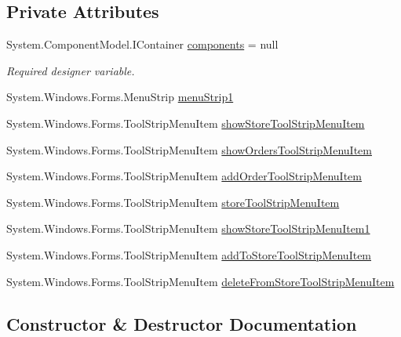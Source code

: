\subsection*{Private Attributes}
\begin{DoxyCompactItemize}
\item 
System.\+Component\+Model.\+I\+Container \hyperlink{classproject__bot_1_1_form1_ae3d10125e5bbe75231a41752b6c0d0c3}{components} = null
\begin{DoxyCompactList}\small\item\em Required designer variable. \end{DoxyCompactList}\item 
System.\+Windows.\+Forms.\+Menu\+Strip \hyperlink{classproject__bot_1_1_form1_aa0a045583c3d5292cbd2d85c6f0ffc14}{menu\+Strip1}
\item 
System.\+Windows.\+Forms.\+Tool\+Strip\+Menu\+Item \hyperlink{classproject__bot_1_1_form1_ae87030df87d3921dfcd2a264d98ef8fa}{show\+Store\+Tool\+Strip\+Menu\+Item}
\item 
System.\+Windows.\+Forms.\+Tool\+Strip\+Menu\+Item \hyperlink{classproject__bot_1_1_form1_ae853b3da023018b1020416131cd8860a}{show\+Orders\+Tool\+Strip\+Menu\+Item}
\item 
System.\+Windows.\+Forms.\+Tool\+Strip\+Menu\+Item \hyperlink{classproject__bot_1_1_form1_a3ed39383d4d1b17c5009fec69998a876}{add\+Order\+Tool\+Strip\+Menu\+Item}
\item 
System.\+Windows.\+Forms.\+Tool\+Strip\+Menu\+Item \hyperlink{classproject__bot_1_1_form1_a085fc9e73481af539c9665378b0544f3}{store\+Tool\+Strip\+Menu\+Item}
\item 
System.\+Windows.\+Forms.\+Tool\+Strip\+Menu\+Item \hyperlink{classproject__bot_1_1_form1_aa538911ec63c218619f9f3746b97fee6}{show\+Store\+Tool\+Strip\+Menu\+Item1}
\item 
System.\+Windows.\+Forms.\+Tool\+Strip\+Menu\+Item \hyperlink{classproject__bot_1_1_form1_abde9f8997c19fa6590d3190ab346339c}{add\+To\+Store\+Tool\+Strip\+Menu\+Item}
\item 
System.\+Windows.\+Forms.\+Tool\+Strip\+Menu\+Item \hyperlink{classproject__bot_1_1_form1_a186cc3cc930d3082757cbbbcc5242eb4}{delete\+From\+Store\+Tool\+Strip\+Menu\+Item}
\end{DoxyCompactItemize}


\subsection{Constructor \& Destructor Documentation}
\mbox{\label{classproject__bot_1_1_form1_a2d02bb4e7647a42a58a86fd94de1d415}} 
